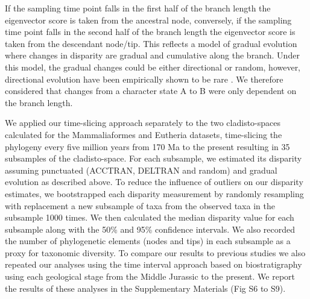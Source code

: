 \documentclass[10pt,letterpaper]{article}
\begin{document}
\begin{enumerate}
    If the sampling time point falls in the first half of the branch length the eigenvector score is taken from the ancestral node, conversely, if the sampling time point falls in the second half of the branch length the eigenvector score is taken from the descendant node/tip.
    This reflects a model of gradual evolution where changes in disparity are gradual and cumulative along the branch.
    Under this model, the gradual changes could be either directional or random, however, directional evolution have been empirically shown to be rare \citep[only 5\% of the time][]{Hunt20112007}.
    We therefore considered that changes from a character state A to B were only dependent on the branch length.
\end{enumerate}
We applied our time-slicing approach separately to the two cladisto-spaces calculated for the Mammaliaformes and Eutheria datasets, time-slicing the phylogeny every five million years from 170 Ma to the present resulting in 35 subsamples of the cladisto-space.
For each subsample, we estimated its disparity assuming punctuated (ACCTRAN, DELTRAN and random) and gradual evolution as described above.
To reduce the influence of outliers on our disparity estimates, we bootstrapped each disparity measurement by randomly resampling with replacement a new subsample of taxa from the observed taxa in the subsample 1000 times.
We then calculated the median disparity value for each subsample along with the 50\% and 95\% confidence intervals.
We also recorded the number of phylogenetic elements (nodes and tips) in each subsample as a proxy for taxonomic diversity.
To compare our results to previous studies we also repeated our analyses using the time interval approach based on biostratigraphy \citep[e.g.][]{cisneros2010,prentice2011,Hughes20082013,bentonmodels2014} using each geological stage from the Middle Jurassic to the present.
We report the results of these analyses in the Supplementary Materials (Fig S6 to S9).

\end{document}
